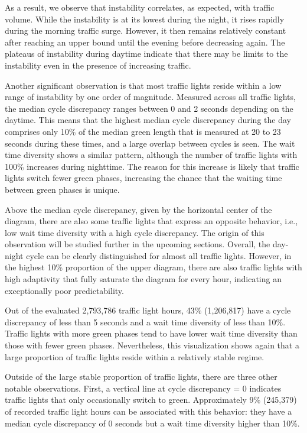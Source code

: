 As a result, we observe that instability correlates, as expected, with traffic volume. While the instability is at its lowest during the night, it rises rapidly during the morning traffic surge. However, it then remains relatively constant after reaching an upper bound until the evening before decreasing again. The plateaus of instability during daytime indicate that there may be limits to the instability even in the presence of increasing traffic. 

Another significant observation is that most traffic lights reside within a low range of instability by one order of magnitude. Measured across all traffic lights, the median cycle discrepancy ranges between 0 and 2 seconds depending on the daytime. This means that the highest median cycle discrepancy during the day comprises only 10\% of the median green length that is measured at 20 to 23 seconds during these times, and a large overlap between cycles is seen. The wait time diversity shows a similar pattern, although the number of traffic lights with 100\% increases during nighttime. The reason for this increase is likely that traffic lights switch fewer green phases, increasing the chance that the waiting time between green phases is unique.



Above the median cycle discrepancy, given by the horizontal center of the diagram, there are also some traffic lights that express an opposite behavior, i.e., low wait time diversity with a high cycle discrepancy. The origin of this observation will be studied further in the upcoming sections. Overall, the day-night cycle can be clearly distinguished for almost all traffic lights. However, in the highest 10\% proportion of the upper diagram, there are also traffic lights with high adaptivity that fully saturate the diagram for every hour, indicating an exceptionally poor predictability. 

Out of the evaluated 2,793,786 traffic light hours, 43\% (1,206,817) have a cycle discrepancy of less than 5 seconds and a wait time diversity of less than 10\%. Traffic lights with more green phases tend to have lower wait time diversity than those with fewer green phases. Nevertheless, this visualization shows again that a large proportion of traffic lights reside within a relatively stable regime.

Outside of the large stable proportion of traffic lights, there are three other notable observations. First, a vertical line at cycle discrepancy = 0 indicates traffic lights that only occasionally switch to green. Approximately 9\% (245,379) of recorded traffic light hours can be associated with this behavior: they have a median cycle discrepancy of 0 seconds but a wait time diversity higher than 10\%. 

